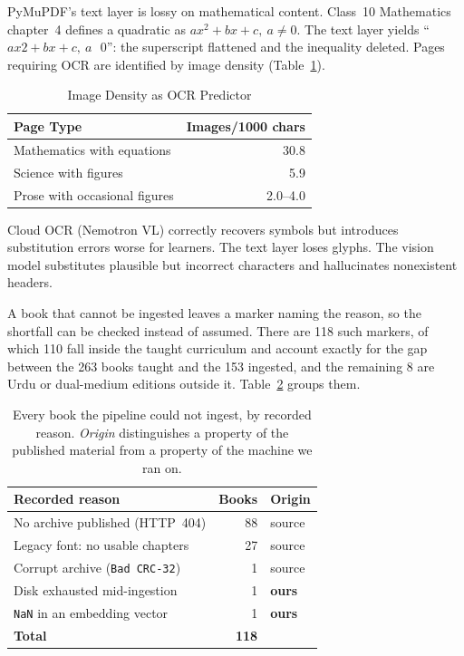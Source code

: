 \ifconf\else  %
PyMuPDF's text layer is lossy on mathematical content. Class~10 Mathematics chapter~4 defines a quadratic as $ax^2 + bx + c,\ a \neq 0$. The text layer yields ``$ax2 + bx + c,\ a\text{~~}0$'': the superscript flattened and the inequality deleted. Pages requiring OCR are identified by image density (Table~\ref{tab:ocr}).

\begin{table}
\caption{Image Density as OCR Predictor}
\label{tab:ocr}
\centering
\begin{tabular}{@{}lr@{}}
\toprule
\textbf{Page Type} & \textbf{Images/1000 chars} \\
\midrule
Mathematics with equations & 30.8 \\
Science with figures & 5.9 \\
Prose with occasional figures & 2.0--4.0 \\
\bottomrule
\end{tabular}
\end{table}

Cloud OCR (Nemotron VL) correctly recovers symbols but introduces substitution errors worse for learners. The text layer loses glyphs. The vision model substitutes plausible but incorrect characters and hallucinates nonexistent headers.

\fi

\ifconf\else  %
\label{sec:deadends}
A book that cannot be ingested leaves a marker naming the reason, so the shortfall can be checked instead of assumed. There are 118 such markers, of which 110 fall inside the taught curriculum and account exactly for the gap between the 263 books taught and the 153 ingested, and the remaining 8 are Urdu or dual-medium editions outside it. Table~\ref{tab:deadends} groups them.

\begin{table}
\caption{Every book the pipeline could not ingest, by recorded reason. \emph{Origin} distinguishes a property of the published material from a property of the machine we ran on.}
\label{tab:deadends}
\centering
\footnotesize
\begin{tabular}{@{}lrl@{}}
\toprule
\textbf{Recorded reason} & \textbf{Books} & \textbf{Origin} \\
\midrule
No archive published (HTTP~404)        & 88 & source \\
Legacy font: no usable chapters        & 27 & source \\
Corrupt archive (\texttt{Bad CRC-32})  & 1  & source \\
\midrule
Disk exhausted mid-ingestion           & 1  & \textbf{ours} \\
\texttt{NaN} in an embedding vector    & 1  & \textbf{ours} \\
\midrule
\textbf{Total}                         & \textbf{118} & \\
\bottomrule
\end{tabular}
\end{table}

